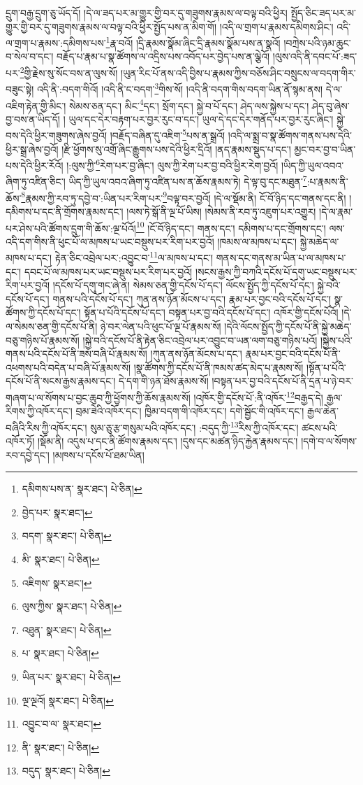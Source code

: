 དྲུག་བརྒྱ་དྲུག་ཅུ་ཡོད་དོ། །དེ་ལ་ཟད་པར་མ་གྱུར་གྱི་བར་དུ་གཟུགས་རྣམས་ལ་བལྟ་བའི་ཕྱིར། སྤྱོད་ཅིང་ཟད་པར་མ་གྱུར་གྱི་བར་དུ་གཟུགས་རྣམས་ལ་བལྟ་བའི་ཕྱིར་སྤྱོད་པས་ན་མིག་གོ། །འདི་ལ་གྲག་པ་རྣམས་དམིགས་ཤིང་། འདི་ལ་གྲག་པ་རྣམས་:དམིགས་པས་\footnote{དམིགས་པས་ན་  སྣར་ཐང་།  པེ་ཅིན། }རྣ་བའོ། །དྲི་རྣམས་སྣོམ་ཞིང་དྲི་རྣམས་སྣོམ་པས་ན་སྣའོ། །བཀྲེས་པའི་ཉམ་ཆུང་བ་སེལ་བ་དང་། བརྗོད་པ་རྣམ་པ་སྣ་ཚོགས་ལ་འདྲིས་པས་འབོད་པར་བྱེད་པས་ན་ལྕེའོ། །ལུས་འདི་ནི་དབང་པོ་:ཟད་པར་\footnote{བྱེད་པར་  སྣར་ཐང་། }གྱི་རྗེས་སུ་སོང་བས་ན་ལུས་སོ། །ཡུན་རིང་པོ་ནས་འདི་བྱིས་པ་རྣམས་ཀྱིས་བཅོས་ཤིང་བསྲུངས་ལ་བདག་གིར་བཟུང་སྟེ། འདི་ནི་:བདག་གིའོ། །འདི་ནི་ང་བདག་\footnote{བདག་  སྣར་ཐང་།  པེ་ཅིན། }གིས་སོ། །འདི་ནི་བདག་གིས་བདག་ཡིན་ནོ་སྙམ་ནས། དེ་ལ་འཇིག་རྟེན་གྱི་མིང་། སེམས་ཅན་དང་། མིང་\footnote{མི་  སྣར་ཐང་།  པེ་ཅིན། }དང་། སྲོག་དང་། སྐྱེ་བ་པོ་དང་། ཤེད་ལས་སྐྱེས་པ་དང་། ཤེད་བུ་ཞེས་བྱ་བས་ན་ཡིད་དོ། །
ཡུལ་དང་དེར་བརྟག་པར་བྱར་རུང་བ་དང་། ཡུལ་དེ་དང་དེར་གནོད་པར་བྱར་རུང་ཞིང་། སྐྱེ་བས་དེའི་ཕྱིར་གཟུགས་ཞེས་བྱའོ། །བརྗོད་བཞིན་དུ་འཇིག་\footnote{འཇིགས་  སྣར་ཐང་། }པས་ན་སྒྲའོ། །འདི་ལ་སྨྲ་བ་སྣ་ཚོགས་གནས་པས་དེའི་ཕྱིར་སྒྲ་ཞེས་བྱའོ། །རྫི་ཕྱོགས་སུ་འགྲོ་ཞིང་རྒྱུགས་པས་དེའི་ཕྱིར་དྲིའོ། །ནད་རྣམས་སྡུད་པ་དང་། མྱང་བར་བྱ་བ་ཡིན་པས་དེའི་ཕྱིར་རོའོ། །:ལུས་ཀྱི་\footnote{ལུས་ཀྱིས་  སྣར་ཐང་།  པེ་ཅིན། }རེག་པར་བྱ་ཞིང་། ལུས་ཀྱི་རེག་པར་བྱ་བའི་ཕྱིར་རེག་བྱའོ། །ཡིད་ཀྱི་ཡུལ་འབའ་ཞིག་ཏུ་འཛིན་ཅིང་། ཡིད་ཀྱི་ཡུལ་འབའ་ཞིག་ཏུ་འཛིན་པས་ན་ཆོས་རྣམས་ཏེ། དེ་ལྟ་བུ་དང་མཐུན་\footnote{འཐུན་  སྣར་ཐང་།  པེ་ཅིན། }:པ་རྣམས་ནི་ཆོས་\footnote{པ་  སྣར་ཐང་།  པེ་ཅིན། }རྣམས་ཀྱི་རབ་ཏུ་དབྱེ་བ་:ཡིན་པར་རིག་པར་\footnote{ཡིན་པར་  སྣར་ཐང་།  པེ་ཅིན། }བལྟ་བར་བྱའོ། །དེ་ལ་སྡོམ་ནི། ངོ་བོ་ཉིད་དང་གནས་དང་ནི། །དམིགས་པ་དང་ནི་གྲོགས་རྣམས་དང་། །ལས་ཏེ་སྒོ་ནི་ལྔ་པོ་ཡིས། །སེམས་ནི་རབ་ཏུ་འཇུག་པར་འགྱུར། །དེ་ལ་རྣམ་པར་ཤེས་པའི་ཚོགས་དྲུག་གི་ཆོས་:ལྔ་པོའོ།\footnote{ལྔ་ལྔའོ།  སྣར་ཐང་།  པེ་ཅིན། } །ངོ་བོ་ཉིད་དང་། གནས་དང་། དམིགས་པ་དང་གྲོགས་དང་། ལས་འདི་དག་གིས་ནི་ཕུང་པོ་ལ་མཁས་པ་ཡང་བསྡུས་པར་རིག་པར་བྱའོ། །ཁམས་ལ་མཁས་པ་དང་། སྐྱེ་མཆེད་ལ་མཁས་པ་དང་། རྟེན་ཅིང་འབྲེལ་པར་:འབྱུང་བ་\footnote{འབྱུང་བ་ལ་  སྣར་ཐང་། }ལ་མཁས་པ་དང་། གནས་དང་གནས་མ་ཡིན་པ་ལ་མཁས་པ་དང་། དབང་པོ་ལ་མཁས་པར་ཡང་བསྡུས་པར་རིག་པར་བྱའོ། །སངས་རྒྱས་ཀྱི་བཀའི་དངོས་པོ་དགུ་ཡང་བསྡུས་པར་རིག་པར་བྱའོ། །དངོས་པོ་དགུ་གང་ཞེ་ན། སེམས་ཅན་གྱི་དངོས་པོ་དང་། ལོངས་སྤྱོད་ཀྱི་དངོས་པོ་དང་། སྐྱེ་བའི་དངོས་པོ་དང་། གནས་པའི་དངོས་པོ་དང་། ཀུན་ནས་ཉོན་མོངས་པ་དང་། རྣམ་པར་བྱང་བའི་དངོས་པོ་དང་། སྣ་ཚོགས་ཀྱི་དངོས་པོ་དང་། སྟོན་པ་པོའི་དངོས་པོ་དང་། བསྟན་པར་བྱ་བའི་དངོས་པོ་དང་། འཁོར་གྱི་དངོས་པོའོ། །དེ་ལ་སེམས་ཅན་གྱི་དངོས་པོ་ནི། ཉེ་བར་ལེན་པའི་ཕུང་པོ་ལྔ་པོ་རྣམས་སོ། །དེའི་ལོངས་སྤྱོད་ཀྱི་དངོས་པོ་ནི་སྐྱེ་མཆེད་བཅུ་གཉིས་པོ་རྣམས་སོ། །སྐྱེ་བའི་དངོས་པོ་ནི་རྟེན་ཅིང་འབྲེལ་པར་འབྱུང་བ་ཡན་ལག་བཅུ་གཉིས་པའོ། །སྐྱེས་པའི་གནས་པའི་དངོས་པོ་ནི་ཟས་བཞི་པོ་རྣམས་སོ། །ཀུན་ནས་ཉོན་མོངས་པ་དང་། རྣམ་པར་བྱང་བའི་དངོས་པོ་ནི་འཕགས་པའི་བདེན་པ་བཞི་པོ་རྣམས་སོ། །སྣ་ཚོགས་ཀྱི་དངོས་པོ་ནི་ཁམས་ཚད་མེད་པ་རྣམས་སོ། །སྟོན་པ་པོའི་དངོས་པོ་ནི་སངས་རྒྱས་རྣམས་དང་། དེ་དག་གི་ཉན་ཐོས་རྣམས་སོ། །བསྟན་པར་བྱ་བའི་དངོས་པོ་ནི་དྲན་པ་ཉེ་བར་གཞག་པ་ལ་སོགས་པ་བྱང་ཆུབ་ཀྱི་ཕྱོགས་ཀྱི་ཆོས་རྣམས་སོ། །འཁོར་གྱི་དངོས་པོ་:ནི་འཁོར་\footnote{ནི་  སྣར་ཐང་།  པེ་ཅིན། }བརྒྱད་དེ། རྒྱལ་རིགས་ཀྱི་འཁོར་དང་། བྲམ་ཟེའི་འཁོར་དང་། ཁྱིམ་བདག་གི་འཁོར་དང་། དགེ་སྦྱོང་གི་འཁོར་དང་། རྒྱལ་ཆེན་བཞིའི་རིས་ཀྱི་འཁོར་དང་། སུམ་ཅུ་རྩ་གསུམ་པའི་འཁོར་དང་། :བདུད་ཀྱི་\footnote{བདུད་  སྣར་ཐང་།  པེ་ཅིན། }རིས་ཀྱི་འཁོར་དང་། ཚངས་པའི་འཁོར་ཏོ། །སྡོམ་ནི། འདུས་པ་དང་ནི་ཚོགས་རྣམས་དང་། །དུས་དང་མཚན་ཉིད་རྐྱེན་རྣམས་དང་། །དགེ་བ་ལ་སོགས་རབ་དབྱེ་དང་། །མཁས་པ་དངོས་པོ་ཐམ་ཡིན། 